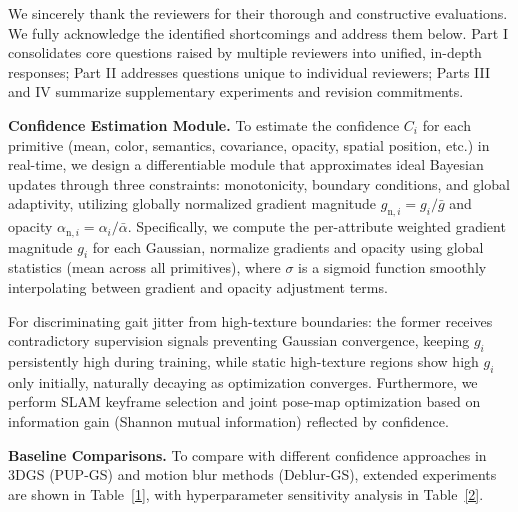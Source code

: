 \documentclass[conference]{IEEEtran}
\begin{document}

We sincerely thank the reviewers for their thorough and constructive evaluations. We fully acknowledge the identified shortcomings and address them below. Part I consolidates core questions raised by multiple reviewers into unified, in-depth responses; Part II addresses questions unique to individual reviewers; Parts III and IV summarize supplementary experiments and revision commitments.


\textbf{Confidence Estimation Module.} To estimate the confidence $C_i$ for each primitive (mean, color, semantics, covariance, opacity, spatial position, etc.) in real-time, we design a differentiable module that approximates ideal Bayesian updates through three constraints: monotonicity, boundary conditions, and global adaptivity, utilizing globally normalized gradient magnitude $g_{\text{n},i} = g_i / \bar{g}$ and opacity $\alpha_{\text{n},i} = \alpha_i / \bar{\alpha}$. Specifically, we compute the per-attribute weighted gradient magnitude $g_i$ for each Gaussian, normalize gradients and opacity using global statistics (mean across all primitives), where $\sigma$ is a sigmoid function smoothly interpolating between gradient and opacity adjustment terms.

For discriminating gait jitter from high-texture boundaries: the former receives contradictory supervision signals preventing Gaussian convergence, keeping $g_i$ persistently high during training, while static high-texture regions show high $g_i$ only initially, naturally decaying as optimization converges. Furthermore, we perform SLAM keyframe selection and joint pose-map optimization based on information gain (Shannon mutual information) reflected by confidence.

\textbf{Baseline Comparisons.} To compare with different confidence approaches in 3DGS (PUP-GS) and motion blur methods (Deblur-GS), extended experiments are shown in Table~\ref{1}, with hyperparameter sensitivity analysis in Table~\ref{2}.
\end{document}
